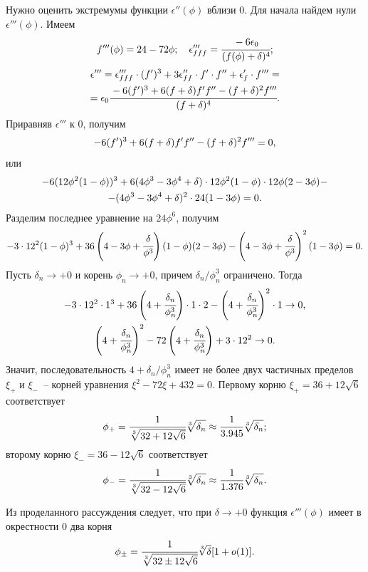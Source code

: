 Нужно оценить экстремумы функции $\epsilon''(\phi)$ вблизи $0$. Для начала найдем нули $\epsilon'''(\phi)$. Имеем
\multeqstart
$$f'''(\phi) = 24 - 72 \phi; \quad \epsilon'''_{fff} = \cfrac{-6 \epsilon_0}{(f(\phi) + \delta)^4} {\text{;}}$$
\multeqnext
\begin{multline*}
	\epsilon''' = \epsilon'''_{fff} \cdot (f')^3 + 3 \epsilon''_{ff} \cdot f' \cdot f'' + \epsilon'_f \cdot f''' = \\ = \epsilon_0 \cfrac{-6 (f')^3 + 6 (f + \delta) f' f'' - (f + \delta)^2 f'''}{(f + \delta)^4} {\text{.}}
\end{multline*}
\multeqfinish
Приравняв $\epsilon'''$ к $0$, получим
$$-6 (f')^3 + 6 (f + \delta) f' f'' - (f + \delta)^2 f''' = 0 {\text{,}}$$
или
\begin{multline*}
	-6(12 \phi^2 (1 - \phi))^3 + 6(4 \phi^3 - 3\phi^4 + \delta) \cdot 12 \phi^2 (1 - \phi) \cdot 12 \phi (2 - 3\phi) - \\ - (4 \phi^3 - 3 \phi^4 + \delta)^2 \cdot 24 (1 - 3 \phi) = 0 {\text{.}}
\end{multline*}
Разделим последнее уравнение на $24\phi^6$, получим
$$-3 \cdot 12^2 (1 - \phi)^3 + 36 \left(4 - 3\phi + \cfrac{\delta}{\phi^3} \right)(1 - \phi)(2 - 3\phi) - \left(4 - 3 \phi + \cfrac{\delta}{\phi^3} \right)^2 (1 - 3 \phi) = 0 {\text{.}}$$
Пусть $\delta_n \to +0$ и корень $\phi_n \to +0$, причем $\delta_n / \phi_n^3$ ограничено. Тогда
\begin{gather*}
	-3 \cdot 12^2 \cdot 1^3 + 36 \left(4 + \cfrac{\delta_n}{\phi_n^3} \right) \cdot 1 \cdot 2 - \left(4 + \cfrac{\delta_n}{\phi_n^3} \right)^2 \cdot 1 \to 0 {\text{,}} \\
	\left(4 + \cfrac{\delta_n}{\phi_n^3} \right)^2 - 72 \left(4 + \cfrac{\delta_n}{\phi_n^3} \right) + 3 \cdot 12^2 \to 0 {\text{.}}
\end{gather*}
Значит, последовательность $4 + \delta_n / \phi_n^3$ имеет не более двух частичных пределов $\xi_+$ и $\xi_-$~-- корней уравнения $\xi^2 - 72 \xi + 432 = 0$. Первому корню $\xi_+ = 36 + 12 \sqrt{6}$ соответствует
$$\phi_+ = \cfrac{1}{\sqrt[3]{32 + 12 \sqrt{6}}} \sqrt[3]{\delta_n} \approx \cfrac{1}{3.945} \sqrt[3]{\delta_n} {\text{;}}$$
второму корню $\xi_- = 36 - 12 \sqrt{6}$ соответствует
$$\phi_- = \cfrac{1}{\sqrt[3]{32 - 12 \sqrt{6}}} \sqrt[3]{\delta_n} \approx \cfrac{1}{1.376} \sqrt[3]{\delta_n} {\text{.}}$$

Из проделанного рассуждения следует, что при $\delta \to +0$ функция $\epsilon'''(\phi)$ имеет в окрестности $0$ два корня
$$\phi_{\pm} = \cfrac{1}{\sqrt[3]{32 \pm 12 \sqrt{6}}} \sqrt[3]{\delta} [1 + o(1)] {\text{.}}$$


